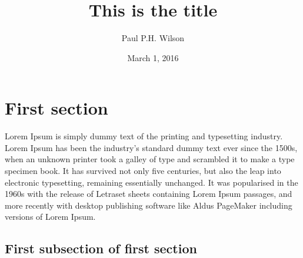 \documentclass[12pt]{article}
\title{This is the title}
\date{March 1, 2016}
\author{Paul P.H. Wilson}
\begin{document}
\maketitle

\tableofcontents

\section{First section}

Lorem Ipsum is simply dummy text of the printing and typesetting
industry. Lorem Ipsum has been the industry's standard dummy text ever since
the 1500s, when an unknown printer took a galley of type and scrambled it to
make a type specimen book. It has survived not only five centuries, but also
the leap into electronic typesetting, remaining essentially unchanged. It was
popularised in the 1960s with the release of Letraset sheets containing Lorem
Ipsum passages, and more recently with desktop publishing software like Aldus
PageMaker including versions of Lorem Ipsum.

\subsection{First subsection of first section}
\end{document}
